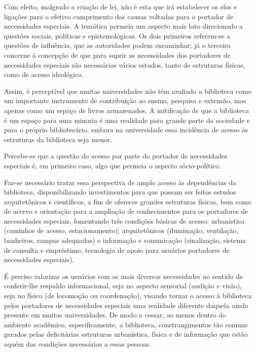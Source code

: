 	Com efeito, malgrado a criação de lei, não é esta que irá estabelecer os elos e ligações para o efetivo cumprimento das causas voltadas para o portador de necessidades especiais. A temática permeia um aspecto mais lato direcionado a questões sociais, políticas e epistemológicas. Os dois primeiros referem-se a questões de influência, que as autoridades podem encaminhar; já o terceiro concerne à concepção de que para suprir as necessidades dos portadores de necessidades especiais são necessários vários estudos, tanto de estruturas físicas, como de acesso ideológico.

	Assim, é perceptível que muitas universidades não têm avaliado a biblioteca como um importante instrumento de contribuição ao ensino, pesquisa e extensão, mas apenas como um espaço de livros armazenados. A mitificação de que a biblioteca é um espaço para uma minoria é uma realidade para grande parte da sociedade e para o próprio bibliotecário, embora na universidade essa incidência de acesso às estruturas da biblioteca seja menor.

	Percebe-se que a questão do acesso por parte do portador de necessidades especiais é, em primeiro caso, algo que permeia o aspecto sócio-político.

	Faz-se necessário tratar essa perspectiva de amplo acesso às dependências da biblioteca, disponibilizando investimentos para que possam ser feitos estudos arquitetônicos e científicos, a fim de oferecer grandes estruturas físicas, bem como de acervo e orientação para a ampliação de conhecimentos para os portadores de necessidades especiais, fomentando três condições básicas de acesso: urbanística (caminhos de acesso, estacionamento); arquitetônicos (iluminação, ventilação, banheiros, rampas adequadas) e informação e comunicação (sinalização, sistema de consulta e empréstimo, tecnologia de apoio para usuários portadores de necessidades especiais).
	
	É preciso valorizar os usuários com as mais diversas necessidades no sentido de conferir-lhe respaldo informacional, seja no aspecto sensorial (audição e visão), seja no físico (de locomoção ou coordenação), visando tornar o acesso à biblioteca pelos portadores de necessidades especiais uma realidade diferente daquela ainda presente em muitas universidades. De modo a cessar, ao menos dentro do ambiente acadêmico, especificamente, a biblioteca, constrangimentos tão comuns gerados pelas deficitárias estruturas urbanística, física e de informação que estão aquém das condições necessárias a essas pessoas.
	
